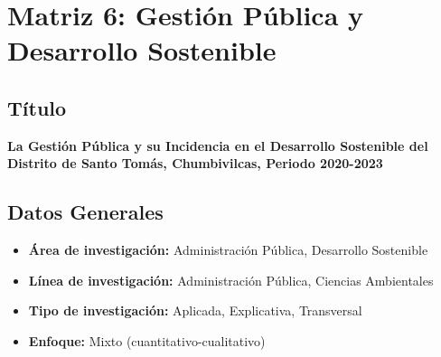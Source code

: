 \documentclass[
  man,
  floatsintext,
  longtable,
  a4paper,
  nolmodern,
  notxfonts,
  notimes,
  12pt,
  colorlinks=true,linkcolor=blue,citecolor=blue,urlcolor=blue]{apa7}
\providecommand{\tightlist}{%
  \setlength{\itemsep}{0pt}\setlength{\parskip}{0pt}}
\begin{document}
\section{Matriz 6: Gestión Pública y Desarrollo
Sostenible}\label{matriz-6-gestiuxf3n-puxfablica-y-desarrollo-sostenible}

\subsection{Título}\label{tuxedtulo-5}

\textbf{La Gestión Pública y su Incidencia en el Desarrollo Sostenible
del Distrito de Santo Tomás, Chumbivilcas, Periodo 2020-2023}

\subsection{Datos Generales}\label{datos-generales-5}

\begin{itemize}
\tightlist
\item
  \textbf{Área de investigación:} Administración Pública, Desarrollo
  Sostenible
\item
  \textbf{Línea de investigación:} Administración Pública, Ciencias
  Ambientales
\item
  \textbf{Tipo de investigación:} Aplicada, Explicativa, Transversal
\item
  \textbf{Enfoque:} Mixto (cuantitativo-cualitativo)
\end{itemize}
\end{document}
